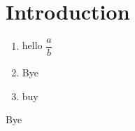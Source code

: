 \section{Introduction}
\begin{frame}
	\begin{enumerate}
		\item hello $\dfrac{a}{b}$
		\item Bye
		\item buy
	\end{enumerate}
\end{frame}

\begin{frame}
	Bye
\end{frame}
